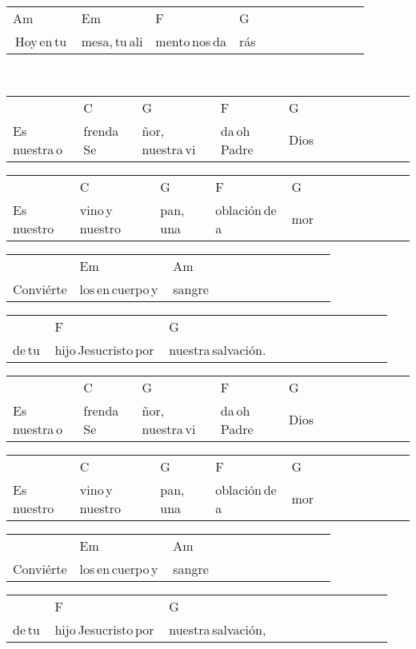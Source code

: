 \begin{multicols}{2}
\begin{minipage}{\columnwidth}
\noindent
\begin{tabular}{llllllllllll}
Am&Em&F&G\\
\,Hoy\,en\,tu\,&mesa,\,tu\,ali&mento\,nos\,da&rás
\end{tabular}
\end{minipage}\\

\noindent
\begin{minipage}{\columnwidth}
\noindent
\noindent
\begin{tabular}{llllllllllll}
&C&G&F&G\\
Es\,nuestra\,o&frenda\,Se&ñor,\,nuestra\,vi&da\,oh\,Padre\,&Dios
\end{tabular}

\noindent
\begin{tabular}{llllllllllll}
&C&G&F&G\\
Es\,nuestro\,&vino\,y\,nuestro\,&pan,\,una\,&oblación\,de\,a&mor
\end{tabular}

\noindent
\begin{tabular}{llllllllllll}
&Em&Am\\
Conviérte&los\,en\,cuerpo\,y\,&sangre
\end{tabular}

\noindent
\begin{tabular}{llllllllllll}
&F&G\\
de\,tu\,&hijo\,Jesucristo\,por\,&nuestra\,salvación.
\end{tabular}

\noindent
\begin{tabular}{llllllllllll}
&C&G&F&G\\
Es\,nuestra\,o&frenda\,Se&ñor,\,nuestra\,vi&da\,oh\,Padre\,&Dios
\end{tabular}

\noindent
\begin{tabular}{llllllllllll}
&C&G&F&G\\
Es\,nuestro\,&vino\,y\,nuestro\,&pan,\,una\,&oblación\,de\,a&mor
\end{tabular}

\noindent
\begin{tabular}{llllllllllll}
&Em&Am\\
Conviérte&los\,en\,cuerpo\,y\,&sangre
\end{tabular}

\noindent
\begin{tabular}{llllllllllll}
&F&G\\
de\,tu\,&hijo\,Jesucristo\,por\,&nuestra\,salvación,
\end{tabular}


\end{minipage}
\end{multicols}

